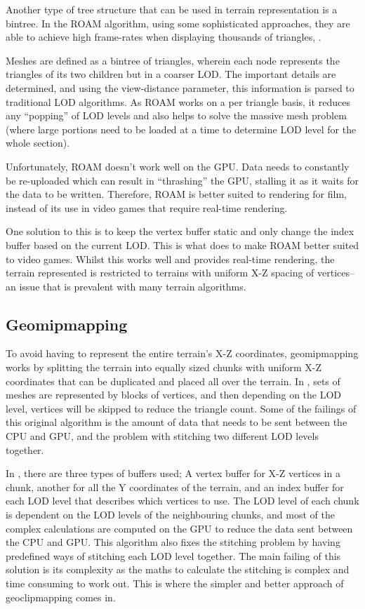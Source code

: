 \documentclass[notitlepage,12pt]{article}
\begin{document}
Another type of tree structure that can be used in terrain representation is a bintree. In the ROAM algorithm, using some sophisticated approaches, they are able to achieve high frame-rates when displaying thousands of triangles, \cite{roam}. 

Meshes are defined as a bintree of triangles, wherein each node represents the triangles of its two children but in a coarser LOD. The important details are determined, and using the view-distance parameter, this information is parsed to traditional LOD algorithms. As ROAM works on a per triangle basis, it reduces any ``popping'' of LOD levels and also helps to solve the massive mesh problem (where large portions need to be loaded at a time to determine LOD level for the whole section).

Unfortunately, ROAM doesn't work well on the GPU. Data needs to constantly be re-uploaded which can result in ``thrashing'' the GPU, stalling it as it waits for the data to be written. Therefore, ROAM is better suited to rendering for film, instead of its use in video games that require real-time rendering.

One solution to this is to keep the vertex buffer static and only change the index buffer based on the current LOD. This is what \cite{roamGeomancy} does to make ROAM better suited to video games. Whilst this works well and provides real-time rendering, the terrain represented is restricted to terrains with uniform X-Z spacing of vertices--an issue that is prevalent with many terrain algorithms.

\subsection{Geomipmapping}

To avoid having to represent the entire terrain's X-Z coordinates, geomipmapping works by splitting the terrain into equally sized chunks with uniform X-Z coordinates that can be duplicated and placed all over the terrain. In \cite{geomipmapping}, sets of meshes are represented by blocks of vertices, and then depending on the LOD level, vertices will be skipped to reduce the triangle count. Some of the failings of this original algorithm is the amount of data that needs to be sent between the CPU and GPU, and the problem with stitching two different LOD levels together.

In \cite{geomipmappingScape}, there are three types of buffers used; A vertex buffer for X-Z vertices in a chunk, another for all the Y coordinates of the terrain, and an index buffer for each LOD level that describes which vertices to use. The LOD level of each chunk is dependent on the LOD levels of the neighbouring chunks, and most of the complex calculations are computed on the GPU to reduce the data sent between the CPU and GPU. This algorithm also fixes the stitching problem by having predefined ways of stitching each LOD level together. The main failing of this solution is its complexity as the maths to calculate the stitching is complex and time consuming to work out. This is where the simpler and better approach of geoclipmapping comes in.
\end{document}
